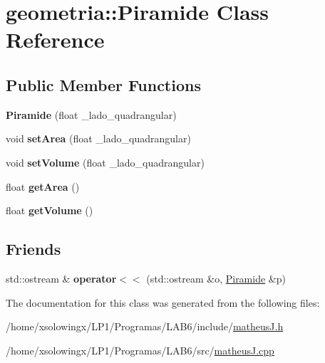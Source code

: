 \hypertarget{classgeometria_1_1Piramide}{}\section{geometria\+:\+:Piramide Class Reference}
\label{classgeometria_1_1Piramide}
\subsection*{Public Member Functions}
\begin{DoxyCompactItemize}
\item 
\mbox{\label{classgeometria_1_1Piramide_a594520d26038905815f0afed361a7428}} 
{\bfseries Piramide} (float \+\_\+lado\+\_\+quadrangular)
\item 
\mbox{\label{classgeometria_1_1Piramide_a8832e683c7361b4f0601eaba6cb914c8}} 
void {\bfseries set\+Area} (float \+\_\+lado\+\_\+quadrangular)
\item 
\mbox{\label{classgeometria_1_1Piramide_a71e7af941e470d312866e9106e047c40}} 
void {\bfseries set\+Volume} (float \+\_\+lado\+\_\+quadrangular)
\item 
\mbox{\label{classgeometria_1_1Piramide_aec156cef733f772d430d28632e9ed001}} 
float {\bfseries get\+Area} ()
\item 
\mbox{\label{classgeometria_1_1Piramide_aaa5a6c9c7dcd301ca3ccdf2f3cae2e6b}} 
float {\bfseries get\+Volume} ()
\end{DoxyCompactItemize}
\subsection*{Friends}
\begin{DoxyCompactItemize}
\item 
\mbox{\label{classgeometria_1_1Piramide_ab3f7e525ab0869ce176c31c0ff490e84}} 
std\+::ostream \& {\bfseries operator$<$$<$} (std\+::ostream \&o, \hyperlink{classgeometria_1_1Piramide}{Piramide} \&p)
\end{DoxyCompactItemize}


The documentation for this class was generated from the following files\+:\begin{DoxyCompactItemize}
\item 
/home/xsolowingx/\+L\+P1/\+Programas/\+L\+A\+B6/include/\hyperlink{matheusJ_8h}{matheus\+J.\+h}\item 
/home/xsolowingx/\+L\+P1/\+Programas/\+L\+A\+B6/src/\hyperlink{matheusJ_8cpp}{matheus\+J.\+cpp}\end{DoxyCompactItemize}
